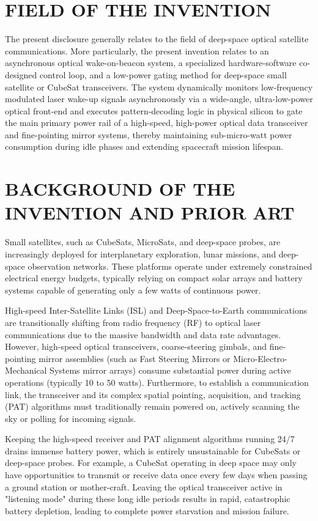 \documentclass[12pt,a4paper]{article}
\begin{document}
\section*{FIELD OF THE INVENTION}
The present disclosure generally relates to the field of deep-space optical satellite communications. More particularly, the present invention relates to an asynchronous optical wake-on-beacon system, a specialized hardware-software co-designed control loop, and a low-power gating method for deep-space small satellite or CubeSat transceivers. The system dynamically monitors low-frequency modulated laser wake-up signals asynchronously via a wide-angle, ultra-low-power optical front-end and executes pattern-decoding logic in physical silicon to gate the main primary power rail of a high-speed, high-power optical data transceiver and fine-pointing mirror systems, thereby maintaining sub-micro-watt power consumption during idle phases and extending spacecraft mission lifespan.

\section*{BACKGROUND OF THE INVENTION AND PRIOR ART}
Small satellites, such as CubeSats, MicroSats, and deep-space probes, are increasingly deployed for interplanetary exploration, lunar missions, and deep-space observation networks. These platforms operate under extremely constrained electrical energy budgets, typically relying on compact solar arrays and battery systems capable of generating only a few watts of continuous power. 

High-speed Inter-Satellite Links (ISL) and Deep-Space-to-Earth communications are transitionally shifting from radio frequency (RF) to optical laser communications due to the massive bandwidth and data rate advantages. However, high-speed optical transceivers, coarse-steering gimbals, and fine-pointing mirror assemblies (such as Fast Steering Mirrors or Micro-Electro-Mechanical Systems mirror arrays) consume substantial power during active operations (typically 10 to 50 watts). Furthermore, to establish a communication link, the transceiver and its complex spatial pointing, acquisition, and tracking (PAT) algorithms must traditionally remain powered on, actively scanning the sky or polling for incoming signals.

Keeping the high-speed receiver and PAT alignment algorithms running 24/7 drains immense battery power, which is entirely unsustainable for CubeSats or deep-space probes. For example, a CubeSat operating in deep space may only have opportunities to transmit or receive data once every few days when passing a ground station or mother-craft. Leaving the optical transceiver active in "listening mode" during these long idle periods results in rapid, catastrophic battery depletion, leading to complete power starvation and mission failure.
\end{document}
